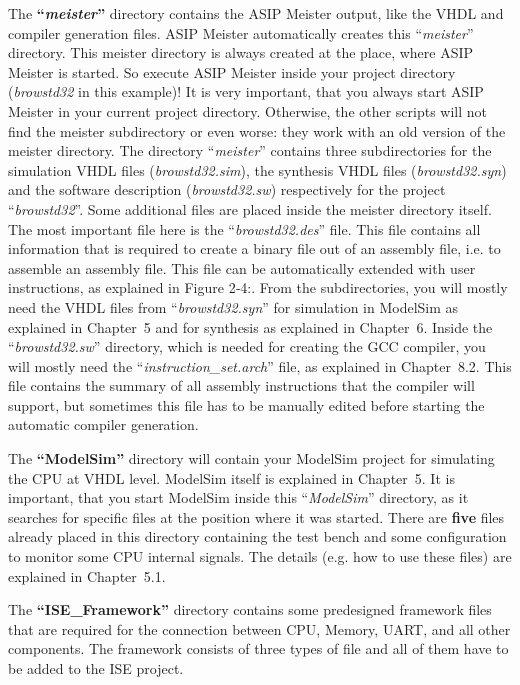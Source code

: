 The \textbf{``\emph{meister}''} directory contains the ASIP Meister
output, like the VHDL and compiler generation files. ASIP Meister
automatically creates this ``\emph{meister}'' directory. This meister
directory is always created at the place, where ASIP Meister is started.
So execute ASIP Meister inside your project directory (\emph{browstd32}
in this example)! It is very important, that you always start ASIP
Meister in your current project directory. Otherwise, the other scripts
will not find the meister subdirectory or even worse: they work with an
old version of the meister directory. The directory ``\emph{meister}''
contains three subdirectories for the simulation VHDL files
(\emph{browstd32.sim}), the synthesis VHDL files (\emph{browstd32.syn})
and the software description (\emph{browstd32.sw}) respectively for the
project ``\emph{browstd32}''. Some additional files are placed inside
the meister directory itself. The most important file here is the
``\emph{browstd32.des}'' file. This file contains all information that
is required to create a binary file out of an assembly file, i.e. to
assemble an assembly file. This file can be automatically extended with
user instructions, as explained in Figure 2‑4:. From the subdirectories,
you will mostly need the VHDL files from ``\emph{browstd32.syn}'' for
simulation in ModelSim as explained in Chapter~5 and for synthesis as
explained in Chapter~6. Inside the ``\emph{browstd32.sw}'' directory,
which is needed for creating the GCC compiler, you will mostly need the
``\emph{instruction\_set.arch}'' file, as explained in Chapter~8.2. This
file contains the summary of all assembly instructions that the compiler
will support, but sometimes this file has to be manually edited before
starting the automatic compiler generation.

The \textbf{``ModelSim''} directory will contain your ModelSim project
for simulating the CPU at VHDL level. ModelSim itself is explained in
Chapter~5. It is important, that you start ModelSim inside this
``\emph{ModelSim}'' directory, as it searches for specific files at the
position where it was started. There are \textbf{five} files already
placed in this directory containing the test bench and some
configuration to monitor some CPU internal signals. The details (e.g.
how to use these files) are explained in Chapter~5.1.

The \textbf{``}\textbf{ISE\_}\textbf{Framework''} directory contains
some predesigned framework files that are required for the connection
between CPU, Memory, UART, and all other components. The framework
consists of three types of file and all of them have to be added to the
ISE project.

